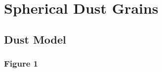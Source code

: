 \section{Spherical Dust Grains}



\subsection{Dust Model}

\subsubsection{\cite{Kataoka_2015} Figure 1}